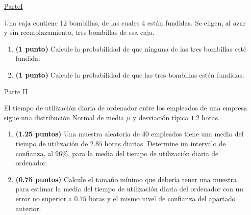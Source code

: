 
\noindent\underline{ParteI}

Una caja contiene 12 bombillas, de las cuales 4 están fundidas. Se eligen, al azar y sin reemplazamiento, tres bombillas de esa caja.
\begin{enumerate}[label=\alph*)]
\item \textbf{(1 punto)} Calcule la probabilidad de que ninguna de las tres bombillas esté fundida.
\item \textbf{(1 punto)} Calcule la probabilidad de que las tres bombillas estén fundidas.
\end{enumerate}
\par\noindent\begin{minipage}{\linewidth}
\noindent\underline{Parte II}

El tiempo de utilización diaria de ordenador entre los empleados de una empresa sigue una distribución Normal de media $\mu$ y desviación típica $1.2$ horas.
\begin{enumerate}[label=\alph*)]
\item \textbf{(1.25 puntos)} Una muestra aleatoria de 40 empleados tiene una media del tiempo de utilización de $2.85$ horas diarias. Determine un intervalo de confianza, al $96\%$, para la media del tiempo de utilización diaria de ordenador.
\item \textbf{(0.75 puntos)} Calcule el tamaño mínimo que debería tener una muestra para estimar la media del tiempo de utilización diaria del ordenador con un error no superior a $0.75$ horas y el mismo nivel de confianza del apartado anterior.
\end{enumerate}
\end{minipage}\par
